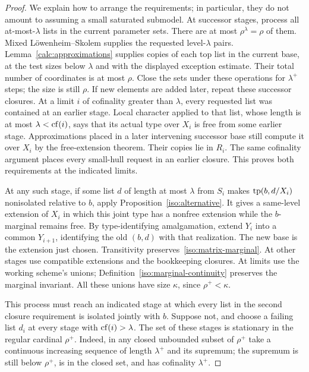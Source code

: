 \begin{proof}
We explain how to arrange the requirements; in particular, they do not
amount to assuming a small saturated submodel. At successor stages,
process all at-most-$\lambda$ lists in the current parameter sets.
There are at most $\rho^\lambda=\rho$ of them. Mixed
L\"owenheim--Skolem supplies the requested level-$\lambda$ pairs.
Lemma~\ref{calc:approximations} supplies copies of each top list in the
current base, at the test sizes below $\lambda$ and with the displayed
exception estimate. Their total number of coordinates is at most
$\rho$. Close the sets under these operations for $\lambda^+$ steps;
the size is still $\rho$. If new elements are added later, repeat these
successor closures. At a limit $i$ of cofinality greater than $\lambda$,
every requested list was contained at an earlier stage. Local character
applied to that list, whose length is at most $\lambda<\operatorname{cf}(i)$, says
that its actual type over $X_i$ is free from some earlier stage.
Approximations placed in a later intervening successor base still
compute it over $X_i$ by the free-extension theorem. Their copies lie
in $R_i$. The same cofinality argument places every small-hull request
in an earlier closure. This proves both requirements at the indicated
limits.

At any such stage, if some list $d$ of length at most $\lambda$ from
$S_i$ makes $\operatorname{tp}(b,d/X_i)$ nonisolated relative to $b$, apply
Proposition~\ref{iso:alternative}. It gives a same-level extension of
$X_i$ in which this joint type has a nonfree extension while the
$b$-marginal remains free. By type-identifying amalgamation, extend
$Y_i$ into a common $Y_{i+1}$, identifying the old $(b,d)$ with that
realization. The new base is the extension just chosen. Transitivity
preserves~\eqref{iso:matrix-marginal}. At other stages use compatible
extensions and the bookkeeping closures. At limits use the working
scheme's unions; Definition~\ref{iso:marginal-continuity} preserves
the marginal invariant. All these unions have size $\kappa$, since
$\rho^+<\kappa$.

This process must reach an indicated stage at which every list in the
second closure requirement is isolated jointly with $b$. Suppose not,
and choose a failing list $d_i$ at every stage with $\operatorname{cf}(i)>\lambda$.
The set of these stages is stationary in the regular cardinal
$\rho^+$. Indeed, in any closed unbounded subset of $\rho^+$ take a
continuous increasing sequence of length $\lambda^+$ and its
supremum; the supremum is still below $\rho^+$, is in the closed
set, and has cofinality $\lambda^+$.


\end{proof}
